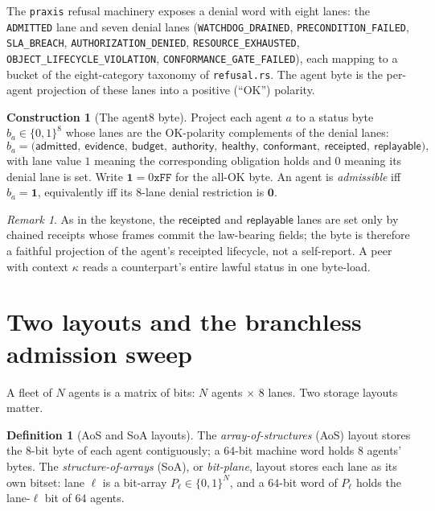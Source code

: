 \documentclass[11pt,oneside]{book}
\theoremstyle{definition}
\newtheorem{definition}{Definition}[chapter]
\newtheorem{construction}{Construction}[chapter]
\theoremstyle{plain}
\theoremstyle{remark}
\newtheorem*{remark}{Remark}
\newcommand{\CL}{\kappa}                       %
\newcommand{\code}[1]{\texttt{#1}}
\newcommand{\abyte}[1]{{b_{#1}}}                 %
\newcommand{\lane}[1]{\ensuremath{\mathsf{#1}}}
\begin{document}
The \code{praxis} refusal machinery exposes a denial word with eight lanes: the \code{ADMITTED} lane and seven denial lanes (\code{WATCHDOG\_DRAINED}, \code{PRECONDITION\_FAILED}, \code{SLA\_BREACH}, \code{AUTHORIZATION\_DENIED}, \code{RESOURCE\_EXHAUSTED}, \code{OBJECT\_LIFECYCLE\_VIOLATION}, \code{CONFORMANCE\_GATE\_FAILED}), each mapping to a bucket of the eight-category taxonomy of \code{refusal.rs}. %
The agent byte is the per-agent projection of these lanes into a positive (``OK'') polarity. %

\begin{construction}[The agent8 byte]\label{con:agent8}
Project each agent $a$ to a status byte $\abyte{a}\in\{0,1\}^{8}$ whose lanes are the OK-polarity complements of the denial lanes:
\[
\abyte{a}=\bigl(\lane{admitted},\ \lane{evidence},\ \lane{budget},\ \lane{authority},\ \lane{healthy},\ \lane{conformant},\ \lane{receipted},\ \lane{replayable}\bigr),
\]
with lane value $1$ meaning the corresponding obligation holds and $0$ meaning its denial lane is set. %
Write $\mathbf 1=0\mathtt{xFF}$ for the all-OK byte. %
An agent is \emph{admissible} iff $\abyte{a}=\mathbf 1$, equivalently iff its $8$-lane denial restriction is $\bm 0$. %
\end{construction}

\begin{remark}
As in the keystone, the \lane{receipted} and \lane{replayable} lanes are set only by chained receipts whose frames commit the law-bearing fields; the byte is therefore a faithful projection of the agent's receipted lifecycle, not a self-report. %
A peer with context $\CL$ reads a counterpart's entire lawful status in one byte-load. %
\end{remark}

\section{Two layouts and the branchless admission sweep}

A fleet of $N$ agents is a matrix of bits: $N$ agents $\times$ $8$ lanes. %
Two storage layouts matter. %

\begin{definition}[AoS and SoA layouts]\label{def:layouts}
The \emph{array-of-structures} (AoS) layout stores the $8$-bit byte of each agent contiguously; a $64$-bit machine word holds $8$ agents' bytes. %
The \emph{structure-of-arrays} (SoA), or \emph{bit-plane}, layout stores each lane as its own bitset: lane $\ell$ is a bit-array $P_\ell\in\{0,1\}^{N}$, and a $64$-bit word of $P_\ell$ holds the lane-$\ell$ bit of $64$ agents. %
\end{definition}
\end{document}
